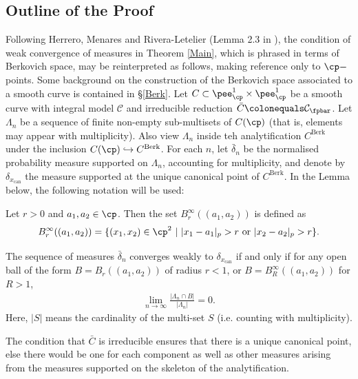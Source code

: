 \documentclass[12pt,letterpaper]{article}
\begin{document}
	
	
	
	
	\subsection{Outline of the Proof}
	
	Following Herrero, Menares and Rivera-Letelier
	(Lemma 2.3 in \cite{HMR20}), the condition of weak convergence of measures in Theorem \ref{Main}, which is phrased in terms of Berkovich space, may be reinterpreted as follows, making reference only to $\cp-$points. Some background on the construction of the Berkovich space associated to a smooth curve is contained in \S\ref{Berk}. 	Let $C\subset \pee^1_{\cp}\times \pee^1_{\cp}$ be a smooth curve with integral model $\mathcal{C}$ and irreducible reduction $\bar{C}\colonequals\mathcal{C}_{\fpbar}$. Let $\Lambda_n$ be a sequence of finite non-empty sub-multisets of $C(\cp)$ (that is, elements may appear with multiplicity). Also view $\Lambda_n$ inside teh analytification $C^\text{Berk}$ under the inclusion $C(\cp)\hookrightarrow C^\text{Berk}$. For each $n$, let $\bar{\delta}_n$ be the normalised probability measure supported on $\Lambda_n$, accounting for multiplicity, and denote by $\delta_{x_\text{can}}$ the measure supported at the unique canonical point of $C^\text{Berk}$. In the Lemma below, the following notation will be used:
	
	\begin{defn}
		Let $r>0$ and $a_1,a_2 \in \cp$. Then the set $B^\infty_r((a_1,a_2))$ is defined as \[B^\infty_r((a_1,a_2))=\{(x_1,x_2)\in \cp^2\ | \ |x_1-a_1|_p>r \text{ or } |x_2-a_2|_p>r\}.\]
	\end{defn} 
	
	\begin{lemma}\label{padiccondition}
	 The sequence of measures $\bar{\delta}_n$ converges weakly to $\delta_{x_\text{can}}$ if and only if for any open ball of the form $B=B_r((a_1,a_2))$ of radius $r<1$, or $B = B^\infty_R((a_1,a_2))$ for $R>1$,
		\begin{align}\label{Limit}
			\lim_{n\to\infty}\frac{|\Lambda_{n}\cap B|}{|\Lambda_{n}|}= 0.
		\end{align} Here, $|S|$ means the cardinality of the multi-set $S$ (i.e. counting with multiplicity).
	\end{lemma}
	
	
	\begin{rem}
		The condition that $\bar{C}$ is irreducible ensures that there is a unique canonical point, else there would be one for each component as well as other measures arising from the measures supported on the skeleton of the analytification.
	\end{rem}
	
\end{document}
